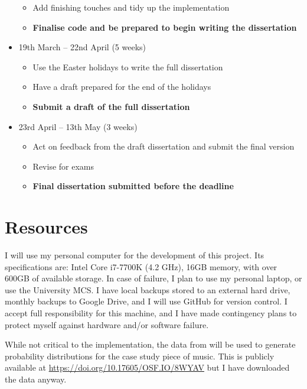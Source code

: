 \documentclass[12pt,twoside,openright]{report}
\begin{document}
\begin{refsection}
\begin{itemize}
\begin{itemize}
    	\item Add finishing touches and tidy up the implementation
    	\item \textbf{Finalise code and be prepared to begin writing the dissertation}
    \end{itemize}
    \item 19th March -- 22nd April (5 weeks)
    \begin{itemize}
    	\item Use the Easter holidays to write the full dissertation
    	\item Have a draft prepared for the end of the holidays
    	\item \textbf{Submit a draft of the full dissertation}
    \end{itemize}
    \item 23rd April -- 13th May (3 weeks)
    \begin{itemize}
    	\item Act on feedback from the draft dissertation and submit the final version
    	\item Revise for exams
    	\item \textbf{Final dissertation submitted before the deadline}
    \end{itemize}
\end{itemize}



\section*{Resources}

I will use my personal computer for the development of this project. Its
specifications are: Intel Core i7-7700K (4.2 GHz), 16GB memory, with over 600GB
of available storage. In case of failure, I plan to use my personal laptop, or
use the University MCS\@. I have local backups stored to an external hard drive,
monthly backups to Google Drive, and I will use GitHub for version control. I
accept full responsibility for this machine, and I have made contingency plans
to protect myself against hardware and/or software failure.

While not critical to the implementation, the data from \cite{jacoby2021} will be used to
generate probability distributions for the case study piece of music. This is
publicly available at \url{https://doi.org/10.17605/OSF.IO/8WYAV} but I have
downloaded the data anyway.



\printbibliography[heading=subbibliography]
\end{refsection}
\end{document}
